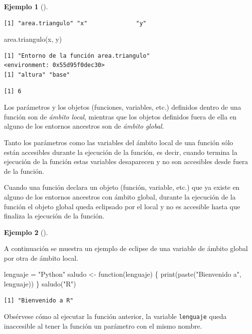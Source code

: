 \documentclass[
  a4paper,
]{scrreport}
\newenvironment{Shaded}{\begin{snugshade}}{\end{snugshade}}
\newcommand{\ControlFlowTok}[1]{\textcolor[rgb]{0.00,0.23,0.31}{#1}}
\newcommand{\FunctionTok}[1]{\textcolor[rgb]{0.28,0.35,0.67}{#1}}
\newcommand{\NormalTok}[1]{\textcolor[rgb]{0.00,0.23,0.31}{#1}}
\newcommand{\OtherTok}[1]{\textcolor[rgb]{0.00,0.23,0.31}{#1}}
\newcommand{\StringTok}[1]{\textcolor[rgb]{0.13,0.47,0.30}{#1}}
\theoremstyle{definition}
\theoremstyle{definition}
\newtheorem{example}{Ejemplo}[chapter]
\theoremstyle{remark}
\begin{document}
\begin{example}[]
\begin{verbatim}
[1] "area.triangulo" "x"              "y"             
\end{verbatim}

\begin{Shaded}
\begin{Highlighting}[]
\FunctionTok{area.triangulo}\NormalTok{(x, y)}
\end{Highlighting}
\end{Shaded}

\begin{verbatim}
[1] "Entorno de la función area.triangulo"
<environment: 0x55d95f0dec30>
[1] "altura" "base"  
\end{verbatim}

\begin{verbatim}
[1] 6
\end{verbatim}

\end{example}

Los parámetros y los objetos (funciones, variables, etc.) definidos
dentro de una función son de \emph{ámbito local}, mientras que los
objetos definidos fuera de ella en alguno de los entornos ancestros son
de \emph{ámbito global}.

Tanto los parámetros como las variables del ámbito local de una función
sólo están accesibles durante la ejecución de la función, es decir,
cuando termina la ejecución de la función estas variables desaparecen y
no son accesibles desde fuera de la función.

Cuando una función declara un objeto (función, variable, etc.) que ya
existe en alguno de los entornos ancestros con ámbito global, durante la
ejecución de la función el objeto global queda eclipsado por el local y
no es accesible hasta que finaliza la ejecución de la función.

\leavevmode{}%
\begin{example}[]\label{exm-eclise-variables-globales-por-locales}

A continuación se muestra un ejemplo de eclipse de una variable de
ámbito global por otra de ámbito local.

\begin{Shaded}
\begin{Highlighting}[]
\NormalTok{lenguaje }\OtherTok{=} \StringTok{"Python"}
\NormalTok{saludo }\OtherTok{\textless{}{-}} \ControlFlowTok{function}\NormalTok{(lenguaje) \{}
  \FunctionTok{print}\NormalTok{(}\FunctionTok{paste}\NormalTok{(}\StringTok{"Bienvenido a"}\NormalTok{, lenguaje))  }
\NormalTok{\}}
\FunctionTok{saludo}\NormalTok{(}\StringTok{"R"}\NormalTok{)}
\end{Highlighting}
\end{Shaded}

\begin{verbatim}
[1] "Bienvenido a R"
\end{verbatim}

Obsérvese cómo al ejecutar la función anterior, la variable
\texttt{lenguaje} queda inaccesible al tener la función un parámetro con
el mismo nombre.

\end{example}
\end{document}
